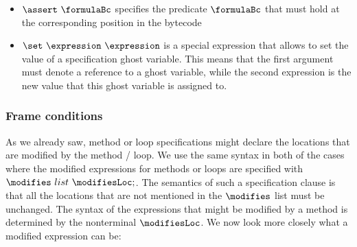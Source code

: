 \begin{itemize}
\begin{itemize}
  \item  $  \assert \ \formulaBc $ specifies the predicate $\formulaBc $ that must hold at the corresponding position in the bytecode

  \item  $ \set \ \expression \  \expression $ is a special expression that allows to set the value of a specification ghost variable. This means
         that the first argument must denote a reference to a ghost variable, while the second expression is the new value that this 
	 ghost variable is assigned to.
\end{itemize}


\end{itemize}

\subsubsection{Frame conditions} 
As we already saw, method or loop specifications  might declare the locations that are modified 
by the method / loop. We use the same syntax in both of the cases where the modified expressions for methods or loops are
 specified with $  \modifies  \ list \   \modifiesLoc;$. The semantics of such a specification clause is that 
all the locations that are not mentioned in the $\modifies$ list must be unchanged.
The syntax of the expressions that might be modified by a method is determined by the nonterminal
$  \modifiesLoc$. We now look more closely what a modified expression can be:
